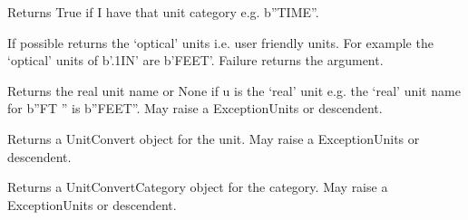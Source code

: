 \documentclass[letterpaper,10pt,english]{sphinxmanual}
\begin{document}
\begin{fulllineitems}
\label{\detokenize{ref/LIS/core/Units:TotalDepth.LIS.core.Units.hasUnitCategory}}
Returns True if I have that unit category e.g. b”TIME”.

\end{fulllineitems}


\begin{fulllineitems}
\label{\detokenize{ref/LIS/core/Units:TotalDepth.LIS.core.Units.opticalUnits}}
If possible returns the ‘optical’ units i.e. user friendly units.
For example the ‘optical’ units of b’.1IN’ are b’FEET’.
Failure returns the argument.

\end{fulllineitems}


\begin{fulllineitems}
\label{\detokenize{ref/LIS/core/Units:TotalDepth.LIS.core.Units.realUnitName}}
Returns the real unit name or None if u is the ‘real’ unit
e.g. the ‘real’ unit name for b”FT  ” is b”FEET”.
May raise a ExceptionUnits or descendent.

\end{fulllineitems}


\begin{fulllineitems}
\label{\detokenize{ref/LIS/core/Units:TotalDepth.LIS.core.Units.retUnitConvert}}
Returns a UnitConvert object for the unit.
May raise a ExceptionUnits or descendent.

\end{fulllineitems}


\begin{fulllineitems}
\label{\detokenize{ref/LIS/core/Units:TotalDepth.LIS.core.Units.retUnitConvertCategory}}
Returns a UnitConvertCategory object for the category.
May raise a ExceptionUnits or descendent.

\end{fulllineitems}
\end{document}

